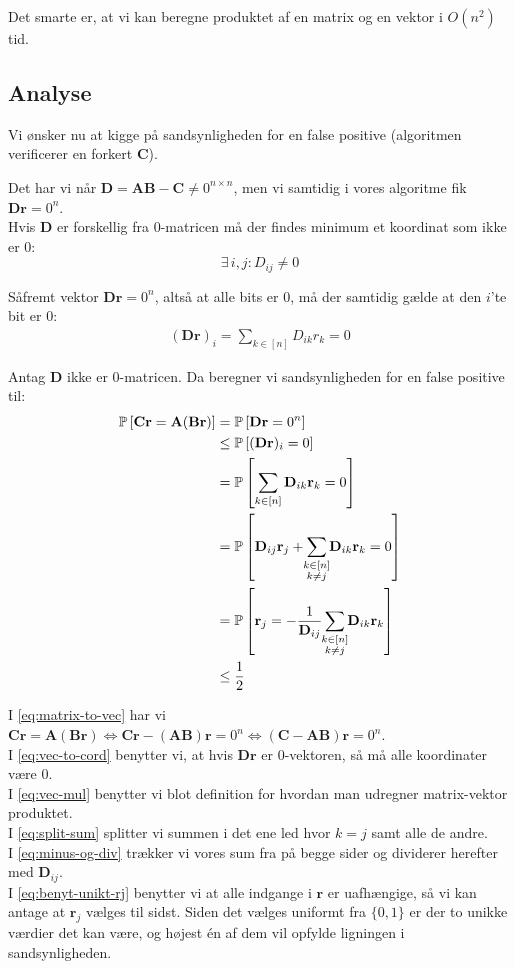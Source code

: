 Det smarte er, at vi kan beregne produktet af en matrix og en vektor i $O(n^2)$ tid.


\subsection{Analyse}
Vi ønsker nu at kigge på sandsynligheden for en false positive (algoritmen verificerer en forkert $\mathbf C$).

Det har vi når $\mathbf D = \mathbf{AB} - \mathbf C \neq 0^{n \times n}$, men vi samtidig i vores algoritme fik $\mathbf{Dr} = 0^n$.\\

Hvis $\mathbf D$ er forskellig fra 0-matricen må der findes minimum et koordinat som ikke er 0:
$$
\exists \, i,j : D_{ij} \neq 0
$$

Såfremt vektor $\mathbf{Dr} = 0^n$, altså at alle bits er 0, må der samtidig gælde at den $i$'te bit er 0:
\begin{align*}
  (\mathbf{Dr})_i = \sum_{k \in [n]} D_{ik} r_k = 0
\end{align*}

Antag $\mathbf D$ ikke er 0-matricen. Da beregner vi sandsynligheden for en false positive til:
\begin{align}
  \P{\mathbf{Cr} = \mathbf A (\mathbf{Br})}
  &= \P{\mathbf{Dr} = 0^n} \label{eq:matrix-to-vec} \\
  &\leq \P{(\mathbf{Dr})_i = 0} \label{eq:vec-to-cord} \\
  &= \P{\sum_{k \in [n]} \mathbf D_{ik} \mathbf r_k = 0} \label{eq:vec-mul} \\
  &= \P{\mathbf D_{ij} \mathbf r_j + \summ{k \in [n]\\ k \neq j} \mathbf D_{ik} \mathbf r_k = 0 } \label{eq:split-sum} \\
  &= \P{\mathbf r_j = - \frac{1}{\mathbf D_{ij}} \summ{k \in [n]\\ k \neq j} \mathbf D_{ik} \mathbf r_k} \label{eq:minus-og-div} \\
  &\leq \frac{1}{2} \label{eq:benyt-unikt-rj}
\end{align}

I \cref{eq:matrix-to-vec} har vi $
\mathbf{Cr} = \mathbf A (\mathbf{Br})
\Longleftrightarrow
\mathbf{Cr} - (\mathbf{AB}) \mathbf{r} = 0^n
\Longleftrightarrow
(\mathbf C - \mathbf{AB}) \mathbf r = 0^n
$.\\
I \cref{eq:vec-to-cord} benytter vi, at hvis $\mathbf{Dr}$ er 0-vektoren, så må alle koordinater være 0.\\
I \cref{eq:vec-mul} benytter vi blot definition for hvordan man udregner matrix-vektor produktet.\\
I \cref{eq:split-sum} splitter vi summen i det ene led hvor $k = j$ samt alle de andre.\\
I \cref{eq:minus-og-div} trækker vi vores sum fra på begge sider og dividerer herefter med $\mathbf D_{ij}$.\\
I \cref{eq:benyt-unikt-rj} benytter vi at alle indgange i $\mathbf r$ er uafhængige, så vi kan antage at $\mathbf r_j$ vælges til sidst. Siden det vælges uniformt fra $\{0, 1\}$ er der to unikke værdier det kan være, og højest én af dem vil opfylde ligningen i sandsynligheden.\\


